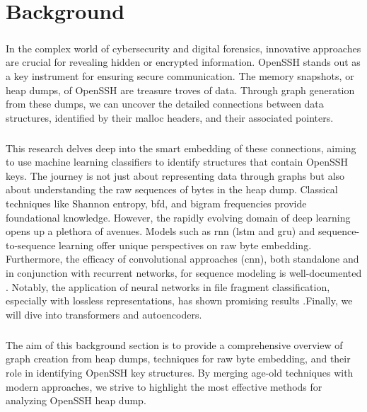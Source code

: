 \chapter{Background}\label{chap:background}


\paragraph*{}In the complex world of cybersecurity and digital forensics, innovative approaches are crucial for revealing hidden or encrypted information. OpenSSH stands out as a key instrument for ensuring secure communication. The memory snapshots, or heap dumps, of OpenSSH are treasure troves of data. Through graph generation from these dumps, we can uncover the detailed connections between data structures, identified by their malloc headers, and their associated pointers.

\paragraph*{}This research delves deep into the smart embedding of these connections, aiming to use machine learning classifiers to identify structures that contain OpenSSH keys. The journey is not just about representing data through graphs but also about understanding the raw sequences of bytes in the heap dump. Classical techniques like Shannon entropy, \acrfull{bfd}, and bigram frequencies provide foundational knowledge. However, the rapidly evolving domain of deep learning opens up a plethora of avenues. Models such as \acrfull{rnn} \cite{lai_recurrent_2015} (\acrfull{lstm}\cite{hochreiter_long_1997} and \acrfull{gru}\cite{chung_empirical_2014}) and sequence-to-sequence learning \cite{sutskever_sequence_2014} offer unique perspectives on raw byte embedding. Furthermore, the efficacy of convolutional approaches (\acrshort{cnn}), both standalone\cite{lecun_gradient-based_1998} and in conjunction with recurrent networks, for sequence modeling is well-documented \cite{bai_empirical_2018}. Notably, the application of neural networks in file fragment classification, especially with lossless representations, has shown promising results \cite{hiester_file_2018}.Finally, we will dive into transformers\cite{vaswani_attention_2017} and autoencoders.

\paragraph*{}The aim of this background section is to provide a comprehensive overview of graph creation from heap dumps, techniques for raw byte embedding, and their role in identifying OpenSSH key structures. By merging age-old techniques with modern approaches, we strive to highlight the most effective methods for analyzing OpenSSH heap dump.

